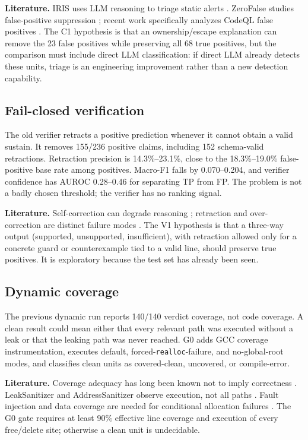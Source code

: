 \documentclass[conference]{IEEEtran}
\begin{document}
\textbf{Literature.} IRIS uses LLM reasoning to triage static alerts \cite{li2025iris}. ZeroFalse studies false-positive suppression \cite{iranmanesh2025zerofalse}; recent work specifically analyzes CodeQL false positives \cite{sajadi2026codeqlfp}. The C1 hypothesis is that an ownership/escape explanation can remove the 23 false positives while preserving all 68 true positives, but the comparison must include direct LLM classification: if direct LLM already detects these units, triage is an engineering improvement rather than a new detection capability.

\subsection{Fail-closed verification}
\label{sec:gap-verify}

The old verifier retracts a positive prediction whenever it cannot obtain a valid sustain. It removes 155/236 positive claims, including 152 schema-valid retractions. Retraction precision is 14.3\%--23.1\%, close to the 18.3\%--19.0\% false-positive base rate among positives. Macro-F1 falls by 0.070--0.204, and verifier confidence has AUROC 0.28--0.46 for separating TP from FP. The problem is not a badly chosen threshold; the verifier has no ranking signal.

\textbf{Literature.} Self-correction can degrade reasoning \cite{huang2024selfcorrect}; retraction and over-correction are distinct failure modes \cite{yang2025retraction,jin2026overcorrection}. The V1 hypothesis is that a three-way output (supported, unsupported, insufficient), with retraction allowed only for a concrete guard or counterexample tied to a valid line, should preserve true positives. It is exploratory because the test set has already been seen.

\subsection{Dynamic coverage}
\label{sec:gap-dynamic}

The previous dynamic run reports 140/140 verdict coverage, not code coverage. A clean result could mean either that every relevant path was executed without a leak or that the leaking path was never reached. G0 adds GCC coverage instrumentation, executes default, forced-\texttt{realloc}-failure, and no-global-root modes, and classifies clean units as covered-clean, uncovered, or compile-error.

\textbf{Literature.} Coverage adequacy has long been known not to imply correctness \cite{zhu1997coverage}. LeakSanitizer and AddressSanitizer observe execution, not all paths \cite{serebryany2012asan,lsan}. Fault injection and data coverage are needed for conditional allocation failures \cite{wang2024datacoverage}. The G0 gate requires at least 90\% effective line coverage and execution of every free/delete site; otherwise a clean unit is undecidable.
\end{document}
